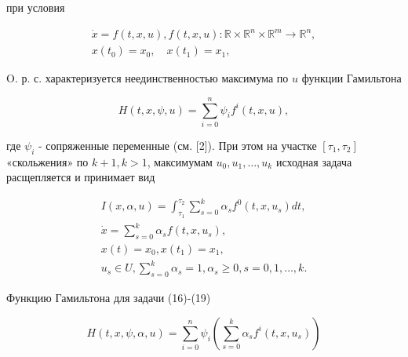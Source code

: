 \documentclass[10pt]{article}
\begin{document}
при условия



\[

\begin{gathered}

\dot{x}=f(t, x, u), f(t, x, u): \mathbb{R} \times \mathbb{R}^{n} \times \mathbb{R}^{m} \rightarrow \mathbb{R}^{n}, \\

x\left(t_{0}\right)=x_{0}, \quad x\left(t_{1}\right)=x_{1},

\end{gathered}

\]



O. р. с. характеризуется неединственностью максимума по $u$ функции Гамильтона



\[

H(t, x, \psi, u)=\sum_{i=0}^{n} \psi_{i} f^{i}(t, x, u),

\]



где $\psi_{i}$ - сопряженные переменные (см. [2]). При этом на участке $\left[\tau_{1}, \tau_{2}\right]$ «скольжения» по $k+1, k>1$, максимумам $u_{0}, u_{1}, \ldots, u_{k}$ исходная задача расщепляется и принимает вид



\[

\begin{gathered}

I(x, \alpha, u)=\int_{\tau_{1}}^{\tau_{2}} \sum_{s=0}^{k} \alpha_{s} f^{0}\left(t, x, u_{s}\right) d t, \\

\dot{x}=\sum_{s=0}^{k} \alpha_{s} f\left(t, x, u_{s}\right), \\

x(t)=x_{0}, x\left(t_{1}\right)=x_{1}, \\

u_{s} \in U, \sum_{s=0}^{k} \alpha_{s}=1, \alpha_{s} \geqslant 0, s=0,1, \ldots, k .

\end{gathered}

\]



Функцию Гамильтона для задачи (16)-(19)



\[

H(t, x, \psi, \alpha, u)=\sum_{i=0}^{n} \psi_{i}\left(\sum_{s=0}^{k} \alpha_{s} f^{i}\left(t, x, u_{s}\right)\right)

\]
\end{document}
